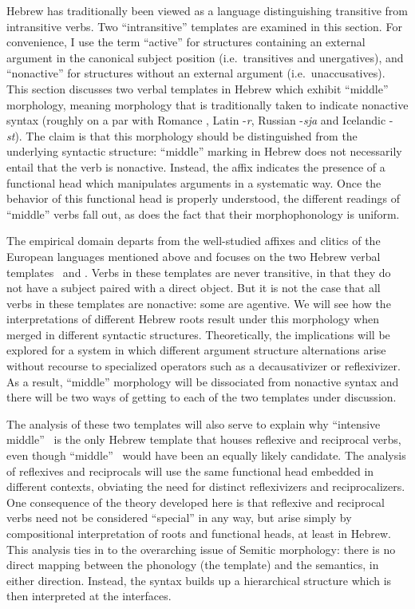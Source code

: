 Hebrew has traditionally been viewed as a language distinguishing transitive from intransitive verbs. Two ``intransitive'' templates are examined in this section. For convenience, I use the term ``active'' for structures containing an external argument in the canonical subject position (i.e.~transitives and unergatives), and ``nonactive'' for structures without an external argument (i.e.~unaccusatives). This section discusses two verbal templates in Hebrew which exhibit ``middle'' morphology, meaning morphology that is traditionally taken to indicate nonactive syntax (roughly on a par with Romance , Latin -\emph{r}, Russian -\emph{sja} and Icelandic -\emph{st}). The claim is that this morphology should be {distinguished} from the underlying syntactic structure: ``middle'' marking in Hebrew does not necessarily entail that the verb is nonactive. Instead, the affix indicates the presence of a functional head which manipulates arguments in a systematic way. Once the behavior of this functional head is properly understood, the different readings of ``middle'' verbs fall out, as does the fact that their morphophonology is uniform.

The empirical domain departs from the well-studied affixes and clitics of the European languages mentioned above and focuses on the two Hebrew verbal templates \textbf{\tnif}~and \textbf{\thit}. Verbs in these templates are never transitive, in that they do not have a subject paired with a direct object. But it is not the case that all verbs in these templates are nonactive: some are agentive. We will see how the interpretations of different Hebrew roots result under this morphology when merged in different syntactic structures. Theoretically, the implications will be explored for a system in which different argument structure alternations arise without recourse to specialized operators such as a decausativizer or reflexivizer. As a result, ``middle'' morphology will be dissociated from nonactive syntax and there will be two ways of getting to each of the two templates under discussion.

The analysis of these two templates will also serve to explain why ``intensive middle'' \thit~is the only Hebrew template that houses reflexive and reciprocal verbs, even though ``middle'' \tnif~would have been an equally likely candidate. The analysis of reflexives and reciprocals will use the same functional head embedded in different contexts, obviating the need for distinct reflexivizers and reciprocalizers. One consequence of the theory developed here is that reflexive and reciprocal verbs need not be considered ``special'' in any way, but arise simply by compositional interpretation of roots and functional heads, at least in Hebrew. This analysis ties in to the overarching issue of Semitic morphology: there is no direct mapping between the phonology (the template) and the semantics, in either direction. Instead, the syntax builds up a hierarchical structure which is then interpreted at the interfaces.

